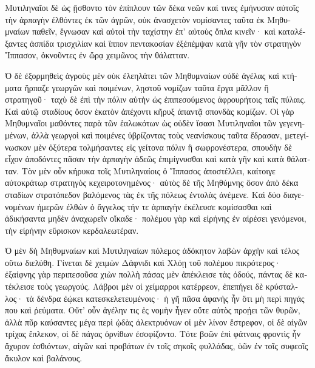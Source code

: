 \documentclass{book}
\begin{document}
\begin{pairs}
\begin{Leftside}
\begin{greek}
  Μυτιληναῖοι δὲ ὡς ᾔσθοντο τὸν ἐπίπλουν τῶν δέκα νεῶν καί τινες ἐμήνυσαν αὐτοῖς τὴν ἁρπαγὴν ἐλθόντες ἐκ τῶν ἀγρῶν, οὐκ ἀνασχετὸν νομίσαντες ταῦτα ἐκ Μηθυμναίων παθεῖν, ἔγνωσαν καὶ αὐτοὶ τὴν ταχίστην ἐπ’ αὐτοὺς ὅπλα κινεῖν·  καὶ καταλέξαντες ἀσπίδα τρισχιλίαν καὶ ἵππον πεντακοσίαν ἐξέπέμψαν κατὰ γῆν τὸν στρατηγὸν Ἵππασον, ὀκνοῦντες ἐν ὥρᾳ χειμῶνος τὴν θάλατταν.
\pend


  Ὁ δὲ ἐξορμηθεὶς ἀγροὺς μὲν οὐκ ἐλεηλάτει τῶν Μηθυμναίων οὐδὲ ἀγέλας καὶ κτήματα ἥρπαζε γεωργῶν καὶ ποιμένων, λῃστοῦ νομίζων ταῦτα ἔργα μᾶλλον ἢ στρατηγοῦ· ταχὺ δὲ ἐπὶ τὴν πόλιν αὐτὴν  ὡς ἐπιπεσούμενος ἀφρουρήτοις ταῖς πύλαις. Καὶ αὐτῷ σταδίους ὅσον ἑκατὸν ἀπέχοντι κῆρυξ ἀπαντᾷ σπονδὰς κομίζων.  Οἱ γὰρ Μηθυμναῖοι μαθόντες παρὰ τῶν ἑαλωκότων ὡς οὐδὲν ἴσασι Μυτιληναῖοι τῶν γεγενημένων, ἀλλὰ γεωργοὶ καὶ ποιμένες ὑβρίζοντας τοὺς νεανίσκους ταῦτα ἔδρασαν, μετεγίνωσκον μὲν ὀξύτερα τολμήσαντες εἰς γείτονα πόλιν ἢ σωφρονέστερα, σπουδὴν δὲ εἶχον ἀποδόντες πᾶσαν τὴν ἁρπαγὴν ἀδεῶς ἐπιμίγνυσθαι καὶ κατὰ γῆν καὶ κατὰ θάλατταν.  Τὸν μὲν οὖν κήρυκα τοῖς Μυτιληναίοις ὁ Ἵππασος ἀποστέλλει, καίτοιγε αὐτοκράτωρ στρατηγὸς κεχειροτονημένος· αὐτὸς δὲ τῆς Μηθύμνης ὅσον ἀπὸ δέκα σταδίων στρατόπεδον βαλόμενος τὰς ἐκ τῆς πόλεως ἐντολὰς ἀνέμενε.  Καὶ δύο διαγενομένων ἡμερῶν ἐλθὼν ὁ ἄγγελος τήν τε ἁρπαγὴν ἐκέλευσε κομίσασθαι καὶ ἀδικήσαντα μηδὲν ἀναχωρεῖν οἴκαδε· πολέμου γὰρ καὶ εἰρήνης ἐν αἱρέσει γενόμενοι, τὴν εἰρήνην εὕρισκον κερδαλεωτέραν.
\pend


  Ὁ μὲν δὴ Μηθυμναίων καὶ Μυτιληναίων πόλεμος ἀδόκητον λαβὼν ἀρχὴν καὶ τέλος οὕτω διελύθη. Γίνεται δὲ χειμὼν Δάφνιδι καὶ Χλόῃ τοῦ πολέμου πικρότερος· ἐξαίφνης γὰρ περιπεσοῦσα χιὼν πολλὴ πάσας μὲν ἀπέκλεισε τὰς ὁδούς, πάντας δὲ κατέκλεισε τοὺς γεωργούς.  Λάβροι μὲν οἱ χείμαρροι κατέρρεον, ἐπεπήγει δὲ κρύσταλλος· τὰ δένδρα ἐῴκει κατεσκελετευμένοις· ἡ γῆ πᾶσα ἀφανὴς ἦν ὅτι μὴ περὶ πηγάς που καὶ ῥεύματα.  Οὔτ’ οὖν ἀγέλην τις ἐς νομὴν ἦγεν οὔτε αὐτὸς προῄει τῶν θυρῶν, ἀλλὰ πῦρ καύσαντες μέγα περὶ ᾠδὰς ἀλεκτρυόνων οἱ μὲν λίνον ἔστρεφον, οἱ δὲ αἰγῶν τρίχας ἔπλεκον, οἱ δὲ πάγας ὀρνίθων ἐσοφίζοντο.  Τότε βοῶν ἐπὶ φάτναις φροντὶς ἦν ἄχυρον ἐσθιόντων, αἰγῶν καὶ προβάτων ἐν τοῖς σηκοῖς φυλλάδας, ὑῶν ἐν τοῖς συφεοῖς ἄκυλον καὶ βαλάνους.
\pend



\end{greek}
\end{Leftside}
\end{pairs}
\end{document}
